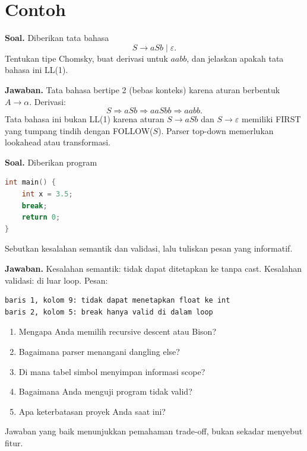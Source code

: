 \section*{Contoh}

\begin{contoh}
\textbf{Soal.} Diberikan tata bahasa
\[
S \to aSb \mid \varepsilon.
\]
Tentukan tipe Chomsky, buat derivasi untuk \(aabb\), dan jelaskan
apakah tata bahasa ini LL(1).

\textbf{Jawaban.} Tata bahasa bertipe 2 (bebas konteks) karena aturan
berbentuk \(A \to \alpha\). Derivasi:
\[
S \Rightarrow aSb \Rightarrow aaSbb \Rightarrow aabb.
\]
Tata bahasa ini bukan LL(1) karena aturan \(S \to aSb\) dan
\(S \to \varepsilon\) memiliki FIRST yang tumpang tindih dengan
FOLLOW(\(S\)). Parser top-down memerlukan lookahead atau
transformasi.
\end{contoh}

\begin{contoh}
\textbf{Soal.} Diberikan program
\begin{lstlisting}[language=C]
int main() {
    int x = 3.5;
    break;
    return 0;
}
\end{lstlisting}
Sebutkan kesalahan semantik dan validasi, lalu tuliskan pesan yang
informatif.

\textbf{Jawaban.} Kesalahan semantik:  tidak dapat
ditetapkan ke  tanpa cast. Kesalahan validasi:
 di luar loop. Pesan:
\begin{lstlisting}[language=bash]
baris 1, kolom 9: tidak dapat menetapkan float ke int
baris 2, kolom 5: break hanya valid di dalam loop
\end{lstlisting}
\end{contoh}

\begin{contoh}
\begin{enumerate}[label=\arabic*.,leftmargin=*]
  \item Mengapa Anda memilih recursive descent atau Bison?
  \item Bagaimana parser menangani dangling else?
  \item Di mana tabel simbol menyimpan informasi scope?
  \item Bagaimana Anda menguji program tidak valid?
  \item Apa keterbatasan proyek Anda saat ini?
\end{enumerate}
Jawaban yang baik menunjukkan pemahaman trade-off, bukan sekadar
menyebut fitur.
\end{contoh}

